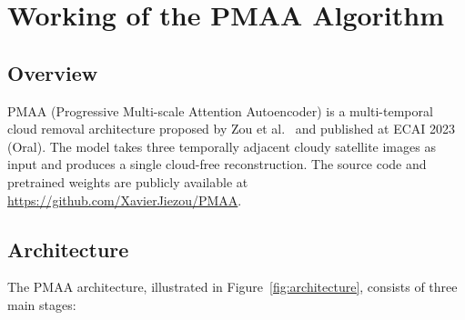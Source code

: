 \documentclass[12pt,a4paper]{article}
\begin{document}

\section{Working of the PMAA Algorithm}

\subsection{Overview}

PMAA (Progressive Multi-scale Attention Autoencoder) is a multi-temporal cloud removal architecture proposed by Zou et al.~\cite{zou2023pmaa} and published at ECAI 2023 (Oral). The model takes three temporally adjacent cloudy satellite images as input and produces a single cloud-free reconstruction. The source code and pretrained weights are publicly available at \url{https://github.com/XavierJiezou/PMAA}.

\subsection{Architecture}

The PMAA architecture, illustrated in Figure~\ref{fig:architecture}, consists of three main stages:
\end{document}
